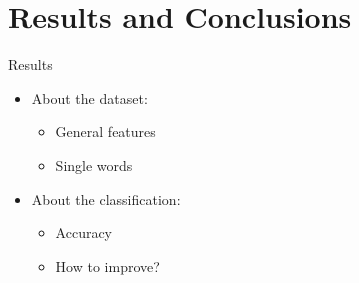 \documentclass[xcolor=x11names,compress]{beamer}
\renewcommand{\(}{\begin{columns}}
\renewcommand{\)}{\end{columns}}
\newcommand{\<}[1]{\begin{column}{#1}}
\renewcommand{\>}{\end{column}}
\begin{document}
\section{Results and Conclusions}
\begin{frame}{Results}
  \begin{itemize}
    \item<1->About the dataset:
      \begin{itemize}
        \item<2->General features
        \item<3->Single words
      \end{itemize}
    \item<4->About the classification:
      \begin{itemize}
        \item<5->Accuracy
        \item<6->How to improve?
      \end{itemize}
  \end{itemize}
\end{frame}

\end{document}

